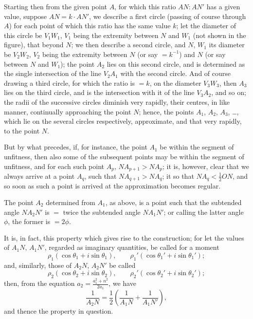 \documentclass[11pt,a4paper]{book}
\begin{document}
Starting then from the given point $A$, for which this ratio
$AN:A N'$ has a given value, suppose $AN=k\cdot AN'$, we describe a first
circle (passing of course through $A$) for each point of which this ratio
has the same value $k$; let the diameter of this circle be $V_1W_1$, $V_1$
being the extremity between $N$ and $W_1$ (not shown in the figure), that
beyond $N$; we then describe a second circle, and $N$, $W_1$ its diameter
be $V_2W_2$, $V_2$ being the extremity between $N$ (or say $=k^{-1}$) and $N$
(or say between $N$ and $W_1$); the point $A_2$ lies on this second circle,
and is determined as the single intersection of the line $V_2A_1$ with the
second circle. And of course drawing a third circle, for which the ratio
is $=k$, on the diameter $V_3W_3$, then $A_3$ lies on the third circle, and is
the intersection with it of the line $V_3A_2$, and so on; the radii of the
successive circles diminish very rapidly, their centres, in like manner,
continually approaching the point $N$; hence, the points $A_1$, $A_2$,
$A_3$, \dots, which lie on the several circles respectively, approximate, and
that very rapidly, to the point $N$.

But by what precedes, if, for instance, the point $A_1$ be within the
segment of unfitness, then also some of the subsequent points may be
within the segment of unfitness, and for each such point $A_p$,
$NA_{p+1}>NA_p$; it is, however, clear that we always arrive at a point
$A_q$, such that $NA_{q+1}>NA_q$; it so that $NA_q<\frac{1}{2}ON$, and so soon
as such a point is arrived at the approximation becomes regular.

The point $A_2$ determined from $A_1$, as above, is a point such that
the subtended angle $NA_2N'$ is $=$ twice the subtended angle $NA_1N'$;
or calling the latter angle $\phi$, the former is $=2\phi$.

It is, in fact, this property which gives rise to the construction; for let
the values of $A_1N$, $A_1N'$, regarded as imaginary quantities, be called for
a moment
\[
\rho_1(\cos\theta_1+i\sin\theta_1),\qquad
\rho_1'(\cos\theta_1'+i\sin\theta_1');
\]
and, similarly, those of $A_2N$, $A_2N'$ be called
\[
\rho_2(\cos\theta_2+i\sin\theta_2),\qquad
\rho_2'(\cos\theta_2'+i\sin\theta_2');
\]
then, from the equation $a_2=\frac{a_1^2+n^2}{2a_1}$, we have
\[
\frac{1}{A_2N} = \frac{1}{2}\left(\frac{1}{A_1N}+\frac{1}{A_1N'}\right),
\]
and thence the property in question.

\newpage
\end{document}
